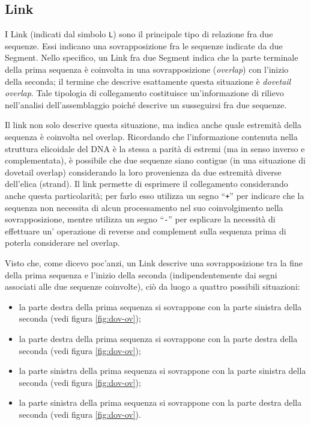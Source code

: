 \subsection{Link}
\label{sec:link}
I Link (indicati dal simbolo \texttt{L}) sono il principale
tipo di relazione fra due sequenze. Essi
indicano una sovrapposizione fra le sequenze indicate da due Segment.
Nello specifico, un Link fra due Segment indica che la parte terminale
della prima sequenza è coinvolta in una sovrapposizione (\emph{overlap})
con l'inizio della seconda; il termine che descrive esattamente questa situazione
è \emph{dovetail overlap}. Tale tipologia di collegamento costituisce
un'informazione di rilievo nell'analisi dell'assemblaggio poiché descrive
un susseguirsi fra due sequenze.

Il link non solo descrive questa situazione, ma indica anche quale
estremità della sequenza è coinvolta nel overlap. Ricordando che
l'informazione contenuta nella struttura elicoidale del DNA è la stessa a parità
di estremi (ma in senso inverso e complementata), è possibile
che due sequenze siano contigue (in una situazione di dovetail
overlap) considerando la loro provenienza da due estremità
diverse dell'elica (strand).
Il link permette di esprimere il collegamento considerando anche questa
particolarità; per farlo esso utilizza un segno ``\texttt{+}'' per indicare
che la sequenza non necessita di alcun processamento nel suo
coinvolgimento nella sovrapposizione, mentre utilizza un segno ``\texttt{-}''
per esplicare la necessità di effettuare un' operazione di reverse
and complement sulla sequenza prima di poterla considerare
nel overlap.

Visto che, come dicevo poc'anzi, un Link descrive una sovrapposizione
tra la fine della prima sequenza e l'inizio della seconda (indipendentemente
dai segni associati alle due sequenze coinvolte), ciò da luogo a quattro
possibili situazioni:
\begin{itemize}
	\item la parte destra della prima sequenza si sovrappone con la parte
		sinistra della seconda (vedi figura \ref{fig:dov-ov});
	\item la parte destra della prima sequenza si sovrappone con la parte
		destra della seconda (vedi figura \ref{fig:dov-ov});
	\item la parte sinistra della prima sequenza si sovrappone con la parte
		sinistra della seconda (vedi figura \ref{fig:dov-ov});
	\item la parte sinistra della prima sequenza si sovrappone con la parte
		destra della seconda (vedi figura \ref{fig:dov-ov}).
\end{itemize}


